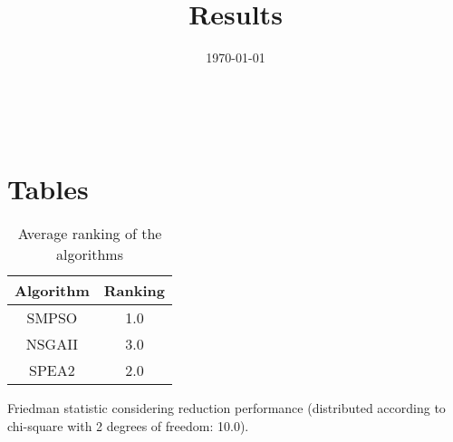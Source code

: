 \documentclass{article}
\title{Results}
\author{}
\date{\today}
\begin{document}
\oddsidemargin 0in \topmargin 0in\maketitle
\
\section{Tables}
\begin{table}[!htp]
\centering
\caption{Average ranking of the algorithms}
\begin{tabular}{c|c}
Algorithm&Ranking\\
\hline
SMPSO&1.0\\
NSGAII&3.0\\
SPEA2&2.0\\
\end{tabular}
\end{table}


Friedman statistic considering reduction performance (distributed according to chi-square with 2 degrees of freedom: 10.0).
\end{document}
